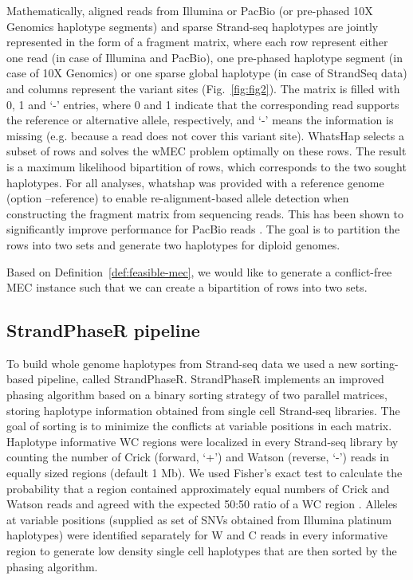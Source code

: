 Mathematically, aligned reads from Illumina or PacBio (or pre-phased 10X Genomics haplotype segments) and sparse Strand-seq haplotypes are jointly represented in the form of a fragment matrix, where each  row represent either one read (in case of Illumina and PacBio), 
one pre-phased haplotype segment (in case of 10X Genomics) or one sparse global haplotype (in case of StrandSeq data) and columns represent the variant sites (Fig.~\ref{fig:fig2}). 
The matrix is filled with 0, 1 and ‘-’ entries, where 0 and 1 indicate that the corresponding read supports the reference or alternative allele, respectively,  and ‘-’ means the information is missing 
(e.g. because a read does not cover this variant site). WhatsHap selects a subset of rows and solves the wMEC problem optimally on these rows. 
The result is a maximum likelihood bipartition of rows, which corresponds to the two sought haplotypes.
For all analyses, whatshap was provided with a reference genome (option --reference) to enable re-alignment-based allele detection when constructing the fragment matrix from sequencing reads. 
This has been shown to significantly improve performance for PacBio reads \citep{martin2016whatshap}.
The goal is to partition the rows into two sets and generate two haplotypes for diploid genomes.

Based on Definition~\ref{def:feasible-mec}, we would like to generate a conflict-free MEC instance such that we can create a bipartition of rows into two sets. 
% 
\subsection{StrandPhaseR pipeline}
	To build whole genome haplotypes from Strand-seq data we used a new sorting-based pipeline, called StrandPhaseR. 
	StrandPhaseR implements an improved phasing algorithm based on a binary sorting strategy of two parallel matrices, storing haplotype information obtained from single cell Strand-seq libraries.
	The goal of sorting is to minimize the conflicts at variable positions in each matrix.
	Haplotype informative WC regions were localized in every Strand-seq library  by counting the number of Crick (forward, ‘+’) and Watson (reverse, ‘-’) reads in equally sized regions (default 1 Mb). 
	We used Fisher's exact test to calculate the probability that a region contained approximately equal numbers of Crick and Watson reads and agreed with the expected 50:50 ratio of a WC region \citep{sanders2016characterizing}. 
	Alleles at variable positions (supplied as set of SNVs obtained from Illumina platinum haplotypes) were identified separately for W and C reads in every informative region to generate low density single cell haplotypes 
	that are then sorted by the phasing algorithm. 
 
